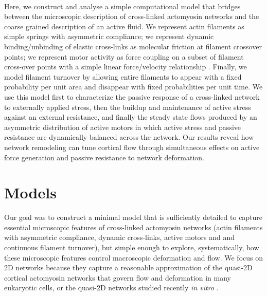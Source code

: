 \documentclass[10pt,letterpaper]{article}
\begin{document}
\paragraph{}  Here, we construct and analyse a simple computational model that bridges between the microscopic description of cross-linked actomyosin networks and the coarse grained description of an active fluid.  We represent actin filaments as simple springs with asymmetric compliance; we represent dynamic binding/unbinding of elastic cross-links as molecular friction \cite{theo_friction,theo_frictionSam,theo_molefric} at filament crossover points; we represent motor activity as force coupling on a subset of filament cross-over points with a simple linear force/velocity relationship \cite{theo_frictionShila}.  Finally, we model filament turnover by allowing entire filaments to appear with a fixed probability per unit area and disappear with fixed probabilities per unit time. We use this model first to characterize the passive response of a cross-linked network to externally applied stress, then the buildup and maintenance of active stress against an external resistance, and finally the steady state flows produced by an asymmetric distribution of active motors in which active stress and passive resistance are dynamically balanced across the network.  Our results reveal how network remodeling can tune cortical flow through simultaneous effects on active force generation and passive resistance to network deformation. 
  

\section*{Models}

Our goal was to construct a minimal model that is sufficiently detailed to capture essential microscopic features of cross-linked actomyosin networks (actin filaments with asymmetric compliance, dynamic cross-links, active motors and and continuous filament turnover), but simple enough to explore, systematically, how these microscopic features control macroscopic deformation and flow. We focus on 2D networks because they capture a reasonable approximation of the quasi-2D cortical actomyosin networks that govern flow and deformation in many eukaryotic cells\cite{cellmech_flows, salbreuxbphs}, or the quasi-2D networks studied recently {\em in vitro} \cite{rheo_2D1,rheo_2D2}.
\end{document}
